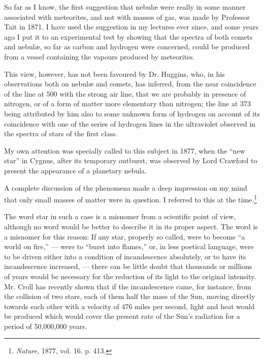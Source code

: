 \documentclass[a4paper, 12pt, oneside, polutonikogreek, english]{article}
\begin{document}
So far as I know, the first suggestion that nebulæ were really in some manner associated with meteorites, and not with masses of gas, was made by Professor Tait in 1871. I have used the suggestion in my lectures ever since, and some years ago I put it to an experimental test by showing that the spectra of both comets and nebulæ, so far as carbon and hydrogen were concerned, could be produced from a vessel containing the vapours produced by meteorites.

This view, however, has not been favoured by Dr. Huggins, who, in his observations both on nebulæ and comets, has inferred, from the near coincidence of the line at 500 with the strong air line, that we are probably in presence of nitrogen, or of a form of matter more elementary than nitrogen; the line at 373 being attributed by him also to some unknown form of hydrogen on account of its coincidence with one of the series of hydrogen lines in the ultraviolet observed in the spectra of stars of the first class.

My own attention was specially called to this subject in 1877, when the ``new star'' in Cygnus, after its temporary outburst, was observed by Lord Crawford to present the appearance of a planetary nebula.

A complete discussion of the phenomena made a deep impression on my mind that only small masses of matter were in question. I referred to this at the time.\footnote{\emph{Nature}, 1877, vol. 16. p. 413.}

The word star in such a case is a misnomer from a scientific point of view, although no word would be better to describe it in its proper aspect. The word is a misnomer for this reason: If any star, properly so called, were to become ``a world on fire,'' --- were to ``burst into flames,'' or, in less poetical language, were to be driven either into a condition of incandescence absolutely, or to have its incandescence increased, --- there can be little doubt that thousands or millions of years would be necessary for the reduction of its light to the original intensity. Mr. Croll has recently shown that if the incandescence came, for instance, from the collision of two stars, each of them half the mass of the Sun, moving directly towards each other with a velocity of 476 miles per second, light and heat would be produced which would cover the present rate of the Sun's radiation for a period of 50,000,000 years.
\end{document}
